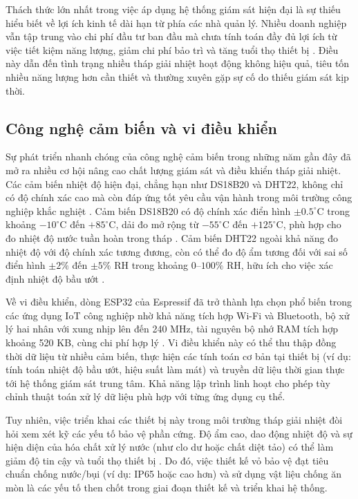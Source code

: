 \documentclass[../main.tex]{subfiles}
\begin{document}
Thách thức lớn nhất trong việc áp dụng hệ thống giám sát hiện đại là sự thiếu hiểu biết về lợi ích kinh tế dài hạn từ phía các nhà quản lý. Nhiều doanh nghiệp vẫn tập trung vào chi phí đầu tư ban đầu mà chưa tính toán đầy đủ lợi ích từ việc tiết kiệm năng lượng, giảm chi phí bảo trì và tăng tuổi thọ thiết bị \cite{iea2023digitalization}. Điều này dẫn đến tình trạng nhiều tháp giải nhiệt hoạt động không hiệu quả, tiêu tốn nhiều năng lượng hơn cần thiết và thường xuyên gặp sự cố do thiếu giám sát kịp thời.

\subsection{Công nghệ cảm biến và vi điều khiển}
\label{sec:sensor_microcontroller_tech}

Sự phát triển nhanh chóng của công nghệ cảm biến trong những năm gần đây đã mở ra nhiều cơ hội nâng cao chất lượng giám sát và điều khiển tháp giải nhiệt. Các cảm biến nhiệt độ hiện đại, chẳng hạn như DS18B20 và DHT22, không chỉ có độ chính xác cao mà còn đáp ứng tốt yêu cầu vận hành trong môi trường công nghiệp khắc nghiệt \cite{ashrae2020cooling}. Cảm biến DS18B20 có độ chính xác điển hình $\pm 0.5^\circ\mathrm{C}$ trong khoảng $-10^\circ\mathrm{C}$ đến $+85^\circ\mathrm{C}$, dải đo mở rộng từ $-55^\circ\mathrm{C}$ đến $+125^\circ\mathrm{C}$, phù hợp cho đo nhiệt độ nước tuần hoàn trong tháp \cite{datasheet_DS18B20}. Cảm biến DHT22 ngoài khả năng đo nhiệt độ với độ chính xác tương đương, còn có thể đo độ ẩm tương đối với sai số điển hình $\pm 2\%$ đến $\pm 5\%$ RH trong khoảng $0$--$100\%$ RH, hữu ích cho việc xác định nhiệt độ bầu ướt \cite{datasheet_DHT22}.

Về vi điều khiển, dòng ESP32 của Espressif đã trở thành lựa chọn phổ biến trong các ứng dụng IoT công nghiệp nhờ khả năng tích hợp Wi-Fi và Bluetooth, bộ xử lý hai nhân với xung nhịp lên đến 240 MHz, tài nguyên bộ nhớ RAM tích hợp khoảng 520 KB, cùng chi phí hợp lý \cite{Espressif_ESP32_technical_reference,statista2023iot}. Vi điều khiển này có thể thu thập đồng thời dữ liệu từ nhiều cảm biến, thực hiện các tính toán cơ bản tại thiết bị (ví dụ: tính toán nhiệt độ bầu ướt, hiệu suất làm mát) và truyền dữ liệu thời gian thực tới hệ thống giám sát trung tâm. Khả năng lập trình linh hoạt cho phép tùy chỉnh thuật toán xử lý dữ liệu phù hợp với từng ứng dụng cụ thể.

Tuy nhiên, việc triển khai các thiết bị này trong môi trường tháp giải nhiệt đòi hỏi xem xét kỹ các yếu tố bảo vệ phần cứng. Độ ẩm cao, dao động nhiệt độ và sự hiện diện của hóa chất xử lý nước (như clo dư hoặc chất diệt tảo) có thể làm giảm độ tin cậy và tuổi thọ thiết bị \cite{epa_cooling_tower_guide_2017}. Do đó, việc thiết kế vỏ bảo vệ đạt tiêu chuẩn chống nước/bụi (ví dụ: IP65 hoặc cao hơn) và sử dụng vật liệu chống ăn mòn là các yếu tố then chốt trong giai đoạn thiết kế và triển khai hệ thống.
\end{document}
